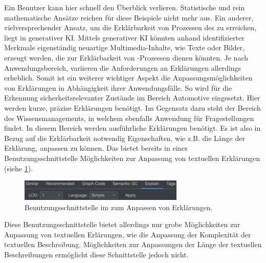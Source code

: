 Ein Benutzer kann hier schnell den Überblick verlieren.
\newline
Statistische und rein mathematische Ansätze reichen für diese Beispiele nicht mehr aus.
Ein anderer, vielversprechender Ansatz, um die Erklärbarkeit von Prozessen des \mmir{} zu erreichen, liegt in generativer KI.
\newline
Mittels generativer KI könnten anhand identifizierter Merkmale eigenständig neuartige Multimedia-Inhalte, wie Texte oder Bilder, erzeugt werden, die zur Erklärbarkeit von \mmir{}-Prozessen dienen könnten.
\newline
Je nach Anwendungsbereich, variieren die Anforderungen an Erklärungen allerdings erheblich.
Somit ist ein weiterer wichtiger Aspekt die Anpassungsmöglichkeiten von Erklärungen in Abhängigkeit ihrer Anwendungsfälle. 
So wird \smmir{} für die Erkennung sicherheitsrelevanter Zustände im Bereich Automotive eingesetzt. 
Hier werden kurze, präzise Erklärungen benötigt. 
Im Gegensatz dazu steht der Bereich des Wissensmanagements, in welchem \smmir{} ebenfalls Anwendung für Fragestellungen findet.
In diesem Bereich werden ausführliche Erklärungen benötigt.
Es ist also in Bezug auf die Erklärbarkeit notwendig Eigenschaften, wie z.B. die Länge der Erklärung, anpassen zu können.
\newline
Das \gmaf{} bietet bereits in einer Benutzungsschnittstelle Möglichkeiten zur Anpassung von textuellen Erklärungen (siehe \cref{explain-ui}).
\begin{figure}[htb]
    \centering
    \includegraphics[width=0.7\textwidth]{resources/images/explain-ui.png}
    \caption{Benutzungsschnittstelle im \gmaf{} zum Anpassen von Erklärungen.}
    \label{explain-ui}
\end{figure}
\noindent
Diese Benutzungsschnittstelle bietet allerdings nur grobe Möglichkeiten zur Anpassung von textuellen Erlärungen, wie die Anpassung der Komplexität der textuellen Beschreibung.
Möglichkeiten zur Anpassungen der Länge der textuellen Beschreibungen ermöglicht diese Schnittstelle jedoch nicht.

